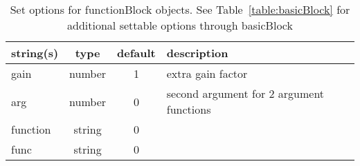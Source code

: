 \begin{table}[ht]
\centering
\begin{tabular}{p{5cm} c c p{7cm}}
\hline
string(s) & type & default & description \\
\hline
gain & number & 1 & extra gain factor\\
arg & number & 0 & second argument for 2 argument functions\\
function & string & 0 & \\
func & string & 0 & \\
\hline
\end{tabular}
\caption{Set options for functionBlock objects. See Table~\ref{table:basicBlock} for additional settable options through basicBlock}
\label{table:functionBlock}
\end{table}

